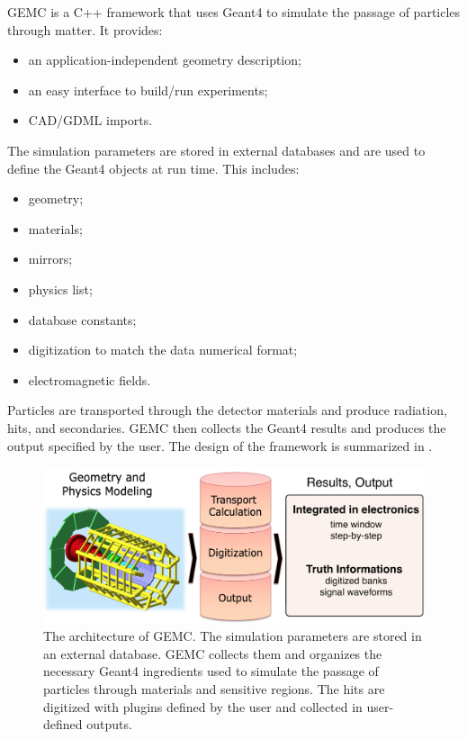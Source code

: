 GEMC is a C++ framework that uses Geant4 \cite{geant4} to simulate the passage of particles through matter. It provides:
\begin{itemize}
	\item an application-independent geometry description;
	\item an easy interface to build/run experiments;
	\item CAD/GDML imports.
\end{itemize}

The simulation parameters are stored in external databases and are used to define the Geant4 objects at run time. This includes:
\begin{itemize}
	\item geometry;
	\item materials;
	\item mirrors;
	\item physics list;
	\item database constants;
	\item digitization to match the data numerical format;
	\item electromagnetic fields.
\end{itemize}

Particles are transported through the detector materials and produce radiation, hits, and secondaries.
GEMC then collects the Geant4 results and produces the output specified by the user.
The design of the framework is summarized in .

\begin{figure}
	\centering
	\includegraphics[width=1.0\columnwidth,keepaspectratio]{img/gemcDesign.png}
	\caption{The architecture of GEMC. The simulation parameters are stored in an external database. GEMC collects
             them and organizes the necessary Geant4 ingredients used to simulate the
             passage of particles through materials and sensitive regions. The hits are digitized with
             plugins defined by the user and collected in user-defined outputs.  }
	\label{fig:gemcDesign}
\end{figure}

